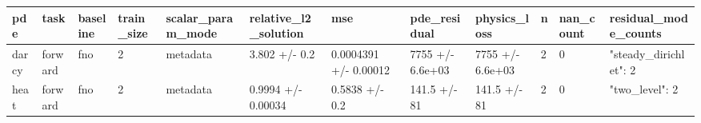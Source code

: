 \begin{tabular}{llllllllllll}
 \hline
pde & task & baseline & train_size & scalar_param_mode & relative_l2_solution & mse & pde_residual & physics_loss & n & nan_count & residual_mode_counts \\
 \hline
darcy & forward & fno & 2 & metadata & 3.802 +/- 0.2 & 0.0004391 +/- 0.00012 & 7755 +/- 6.6e+03 & 7755 +/- 6.6e+03 & 2 & 0 & {"steady\_dirichlet": 2} \\
heat & forward & fno & 2 & metadata & 0.9994 +/- 0.00034 & 0.5838 +/- 0.2 & 141.5 +/- 81 & 141.5 +/- 81 & 2 & 0 & {"two\_level": 2} \\
 \hline
\end{tabular}
